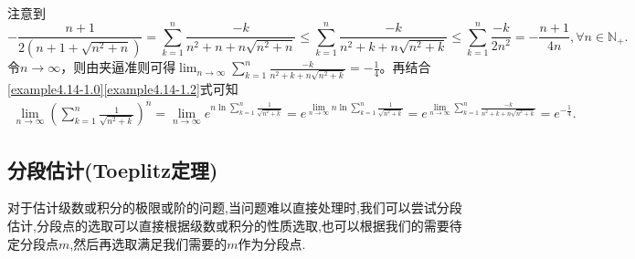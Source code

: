 \documentclass[../../main.tex]{subfiles}
\begin{document}
\begin{solution}
\begin{align}
\end{align}
注意到
\[
-\frac{n+1}{2\left( n+1+\sqrt{n^2+n} \right)}=\sum_{k=1}^n{\frac{-k}{n^2+n+n\sqrt{n^2+n}}}\leqslant \sum_{k=1}^n{\frac{-k}{n^2+k+n\sqrt{n^2+k}}}\leqslant \sum_{k=1}^n{\frac{-k}{2n^2}}=-\frac{n+1}{4n},\forall n\in \mathbb{N}_+.
\]
令\(n\rightarrow \infty\)，则由夹逼准则可得\(\lim_{n\rightarrow \infty} \sum_{k=1}^n{\frac{-k}{n^2+k+n\sqrt{n^2+k}}}=-\frac{1}{4}\)。再结合\eqref{example4.14-1.0}\eqref{example4.14-1.2}式可知
\begin{align*}
\lim_{n\rightarrow \infty} \left( \sum_{k=1}^n{\frac{1}{\sqrt{n^2+k}}} \right) ^n=\lim_{n\rightarrow \infty} e^{n\ln \sum\limits_{k=1}^n{\frac{1}{\sqrt{n^2+k}}}}
=e^{\lim\limits_{n\rightarrow \infty} n\ln \sum\limits_{k=1}^n{\frac{1}{\sqrt{n^2+k}}}}
=e^{\lim\limits_{n\rightarrow \infty} \sum\limits_{k=1}^n{\frac{-k}{n^2+k+n\sqrt{n^2+k}}}}
=e^{-\frac{1}{4}}.
\end{align*}
\end{solution}


\subsection{分段估计(Toeplitz定理)}

对于估计级数或积分的极限或阶的问题,当问题难以直接处理时,我们可以尝试分段估计,分段点的选取可以直接根据级数或积分的性质选取,也可以根据我们的需要待定分段点$m$,然后再选取满足我们需要的$m$作为分段点.
\end{document}

